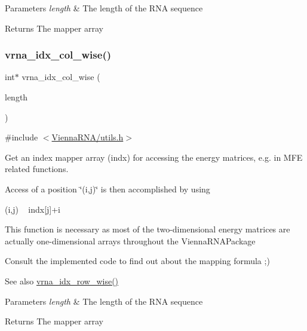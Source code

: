 \begin{DoxyParams}{Parameters}
{\em length} & The length of the R\+NA sequence \\
\hline
\end{DoxyParams}
\begin{DoxyReturn}{Returns}
The mapper array 
\end{DoxyReturn}
\mbox{\label{group__utils_ga89ebc69c52fa0c78c9e1974b0017746b}} 
\subsubsection{\texorpdfstring{vrna\+\_\+idx\+\_\+col\+\_\+wise()}{vrna\_idx\_col\_wise()}}
{\footnotesize\ttfamily int$\ast$ vrna\+\_\+idx\+\_\+col\+\_\+wise (\begin{DoxyParamCaption}\item[{unsigned int}]{length }\end{DoxyParamCaption})}



{\ttfamily \#include $<$\mbox{\hyperlink{utils_8h}{Vienna\+R\+N\+A/utils.\+h}}$>$}



Get an index mapper array (indx) for accessing the energy matrices, e.\+g. in M\+FE related functions. 

Access of a position \char`\"{}(i,j)\char`\"{} is then accomplished by using\begin{DoxyVerb}(i,j) ~ indx[j]+i \end{DoxyVerb}
 This function is necessary as most of the two-\/dimensional energy matrices are actually one-\/dimensional arrays throughout the Vienna\+R\+N\+A\+Package

Consult the implemented code to find out about the mapping formula ;)

\begin{DoxySeeAlso}{See also}
\mbox{\hyperlink{group__utils_ga70b180e9ea764218a82647a1cd347445}{vrna\+\_\+idx\+\_\+row\+\_\+wise()}} 
\end{DoxySeeAlso}

\begin{DoxyParams}{Parameters}
{\em length} & The length of the R\+NA sequence \\
\hline
\end{DoxyParams}
\begin{DoxyReturn}{Returns}
The mapper array 
\end{DoxyReturn}



